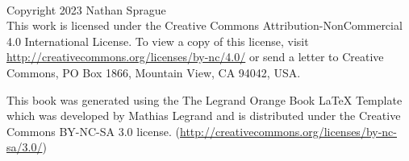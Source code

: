 \documentclass[11pt,fleqn]{book} %
\begin{document}

\begingroup
\thispagestyle{empty} %
\vfill
\endgroup


\newpage
~\vfill
\thispagestyle{empty}

Copyright 2023 Nathan Sprague\\ %

This work is licensed under the Creative Commons
Attribution-NonCommercial 4.0 International License. To view a copy of
this license, visit \url{http://creativecommons.org/licenses/by-nc/4.0/} or
send a letter to Creative Commons, PO Box 1866, Mountain View, CA
94042, USA.

This book was generated using the The Legrand Orange Book LaTeX
Template which was developed by Mathias Legrand and is distributed
under the Creative Commons BY-NC-SA 3.0
license. (\url{http://creativecommons.org/licenses/by-nc-sa/3.0/})






\end{document}
